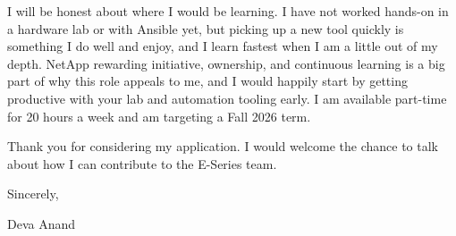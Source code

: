 \documentclass[letterpaper,11pt]{article}
\begin{document}
I will be honest about where I would be learning. I have not worked hands-on in a hardware lab or with Ansible yet, but picking up a new tool quickly is something I do well and enjoy, and I learn fastest when I am a little out of my depth. NetApp rewarding initiative, ownership, and continuous learning is a big part of why this role appeals to me, and I would happily start by getting productive with your lab and automation tooling early. I am available part-time for 20 hours a week and am targeting a Fall 2026 term.

Thank you for considering my application. I would welcome the chance to talk about how I can contribute to the E-Series team.

\vspace{4pt}

Sincerely,

\vspace{2pt}

Deva Anand
\end{document}

